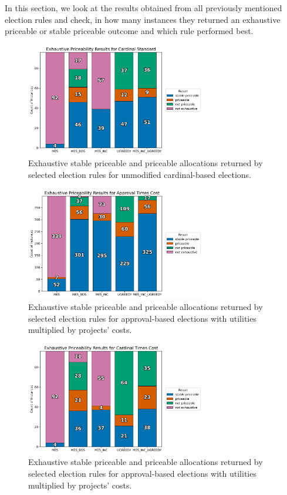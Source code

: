 In this section, we look at the results obtained from all previously mentioned election rules and check, in how many instances they returned an exhaustive priceable or stable priceable outcome and which rule performed best.
\begin{figure}[H]         
  \centering              
  \includegraphics[width=0.7\textwidth]{figures/plots/cardinal-standard/cardinal_standard_exh_priceability.png}
  \caption{Exhaustive stable priceable and priceable allocations returned by selected election rules for unmodified cardinal-based elections.}
  \label{fig:myplot}
\end{figure}
\begin{figure}[H]         
  \centering              
  \includegraphics[width=0.7\textwidth]{figures/plots/approval-times-cost/approval_times_cost_exh_priceability.png}
  \caption{Exhaustive stable priceable and priceable allocations returned by selected election rules for approval-based elections with utilities multiplied by projects' costs.}
  \label{fig:myplot}
\end{figure}
\begin{figure}[H]         
  \centering              
  \includegraphics[width=0.7\textwidth]{figures/plots/cardinal-times-cost/cardinal_times_cost_exh_priceability.png}
  \caption{Exhaustive stable priceable and priceable allocations returned by selected election rules for approval-based elections with utilities multiplied by projects' costs.}
  \label{fig:myplot}
\end{figure}
